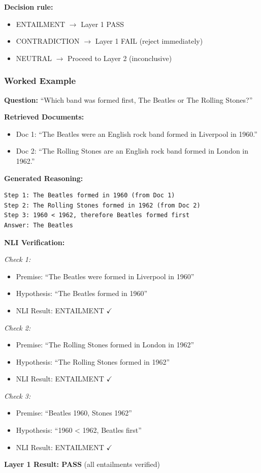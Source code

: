 \documentclass[12pt,a4paper]{article}
\theoremstyle{definition}
\begin{document}
\textbf{Decision rule:}
\begin{itemize}
    \item ENTAILMENT $\rightarrow$ Layer 1 PASS
    \item CONTRADICTION $\rightarrow$ Layer 1 FAIL (reject immediately)
    \item NEUTRAL $\rightarrow$ Proceed to Layer 2 (inconclusive)
\end{itemize}

\subsubsection{Worked Example}

\begin{examplebox}[title=NLI Verification on HotpotQA]

\textbf{Question:} ``Which band was formed first, The Beatles or The Rolling Stones?''

\textbf{Retrieved Documents:}
\begin{itemize}
    \item Doc 1: ``The Beatles were an English rock band formed in Liverpool in 1960.''
    \item Doc 2: ``The Rolling Stones are an English rock band formed in London in 1962.''
\end{itemize}

\textbf{Generated Reasoning:}
\begin{verbatim}
Step 1: The Beatles formed in 1960 (from Doc 1)
Step 2: The Rolling Stones formed in 1962 (from Doc 2)
Step 3: 1960 < 1962, therefore Beatles formed first
Answer: The Beatles
\end{verbatim}

\textbf{NLI Verification:}

\textit{Check 1:}
\begin{itemize}
    \item Premise: ``The Beatles were formed in Liverpool in 1960''
    \item Hypothesis: ``The Beatles formed in 1960''
    \item NLI Result: ENTAILMENT $\checkmark$
\end{itemize}

\textit{Check 2:}
\begin{itemize}
    \item Premise: ``The Rolling Stones formed in London in 1962''
    \item Hypothesis: ``The Rolling Stones formed in 1962''
    \item NLI Result: ENTAILMENT $\checkmark$
\end{itemize}

\textit{Check 3:}
\begin{itemize}
    \item Premise: ``Beatles 1960, Stones 1962''
    \item Hypothesis: ``1960 < 1962, Beatles first''
    \item NLI Result: ENTAILMENT $\checkmark$
\end{itemize}

\textbf{Layer 1 Result: PASS} (all entailments verified)
\end{examplebox}
\end{document}
